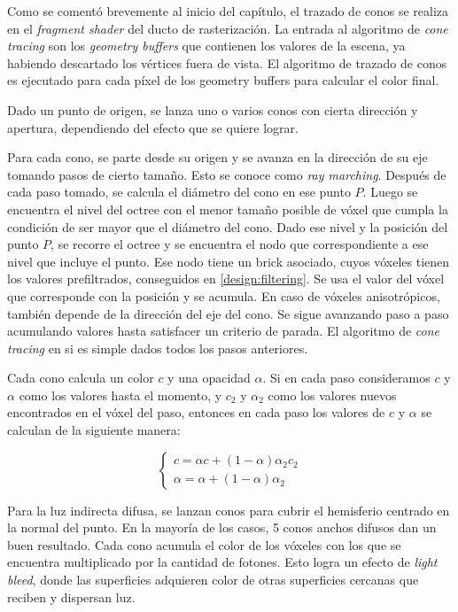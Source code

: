 Como se comentó brevemente al inicio del capítulo, el trazado de conos se realiza en el \textit{fragment shader} del ducto de rasterización.
La entrada al algoritmo de \textit{cone tracing} son los \textit{geometry buffers} que contienen los valores de la escena, ya habiendo descartado los vértices fuera de vista.
El algoritmo de trazado de conos es ejecutado para cada píxel de los geometry buffers para calcular el color final.

Dado un punto de origen, se lanza uno o varios conos con cierta dirección y apertura, dependiendo del efecto que se quiere lograr.

Para cada cono, se parte desde su origen y se avanza en la dirección de su eje tomando pasos de cierto tamaño.
Esto se conoce como \textit{ray marching}. %
Después de cada paso tomado, se calcula el diámetro del cono en ese punto $P$.
Luego se encuentra el nivel del octree con el menor tamaño posible de vóxel que cumpla la condición de ser mayor que el diámetro del cono.
Dado ese nivel y la posición del punto $P$, se recorre el octree y se encuentra el nodo que correspondiente a ese nivel que incluye el punto.
Ese nodo tiene un brick asociado, cuyos vóxeles tienen los valores prefiltrados, conseguidos en \ref{design:filtering}.
Se usa el valor del vóxel que corresponde con la posición y se acumula. En caso de vóxeles anisotrópicos, también depende de la dirección del eje del cono.
Se sigue avanzando paso a paso acumulando valores hasta satisfacer un criterio de parada.
El algoritmo de \textit{cone tracing} en si es simple dados todos los pasos anteriores.

Cada cono calcula un color $c$ y una opacidad $\alpha$.
Si en cada paso consideramos $c$ y $\alpha$ como los valores hasta el momento, y $c_2$ y $\alpha_2$ como los valores nuevos encontrados en el vóxel del paso, entonces en cada paso los valores de $c$ y $\alpha$ se calculan de la siguiente manera:

$$
\begin{cases}
    c = \alpha c + (1 - \alpha) \alpha_2 c_2 \\
    \alpha = \alpha + (1 - \alpha) \alpha_2
\end{cases}
$$

Para la luz indirecta difusa, se lanzan conos para cubrir el hemisferio centrado en la normal del punto.
En la mayoría de los casos, 5 conos anchos difusos dan un buen resultado.
Cada cono acumula el color de los vóxeles con los que se encuentra multiplicado por la cantidad de fotones.
Esto logra un efecto de \textit{light bleed}, donde las superficies adquieren color de otras superficies cercanas que reciben y dispersan luz.

